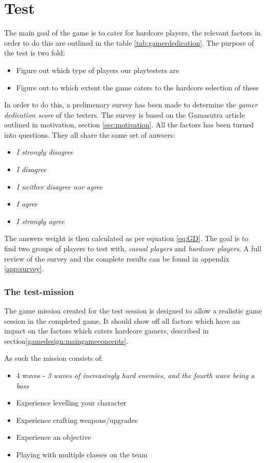 \chapter{Test}
The main goal of the game is to cater for hardcore players, the relevant factors in order to do this are outlined in the table \ref{tab:gamerdedication}. The purpose of the test is two fold:

\begin{itemize}
\item Figure out which type of players our playtesters are
\item Figure out to which extent the game caters to the hardcore selection of these
\end{itemize}

In order to do this, a prelimenary survey has been made to determine the \emph{gamer dedication score} of the testers. The survey is based on the Gamasutra article\cite{casual_vs_hardcore} outlined in motivation, section \ref{sec:motivation}. All the factors has been turned into questions. They all share the same set of anwsers:

\begin{itemize}
\item \emph{I strongly disagree}
\item \emph{I disagree}
\item \emph{I neither disagree nor agree}
\item \emph{I agree}
\item \emph{I strongly agree}
\end{itemize}

The answers weight is then calculated as per equation \ref{eq:GD}. The goal is to find two groups of players to test with, \emph{casual players} and \emph{hardcore players}. A full review of the survey and the complete results can be found in appendix \ref{app:survey}.

\subsection*{The test-mission}
The game mission created for the test session is designed to allow a realistic game session in the completed game. It should show off all factors which have an impact on the factors which caters hardcore gamers, described in section\ref{gamedesign:maingameconcepts}.

As such the mission consists of:

\begin{itemize}
\item 4 waves - \emph{3 waves of increasingly hard enemies, and the fourth wave being a boss}
\item Experience levelling your character
\item Experience crafting weapons/upgrades
\item Experience an objective
\item Playing with multiple classes on the team
\end{itemize}

